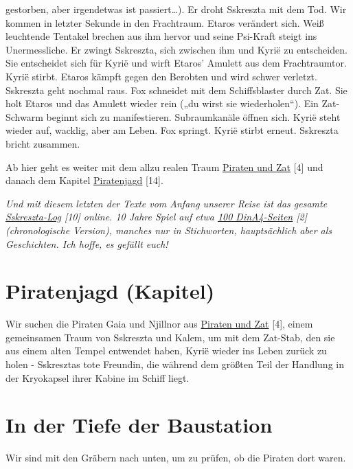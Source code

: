 \documentclass[11pt]{scrartcl}
\begin{document}
\begin{itemize}
{  gestorben, aber irgendetwas ist passiert\ldots{})}. Er droht Sskreszta
  mit dem Tod. Wir kommen in letzter Sekunde in den Frachtraum. Etaros
  verändert sich. Weiß leuchtende Tentakel brechen aus ihm hervor und
  seine Psi-Kraft steigt ins Unermessliche. Er zwingt Sskreszta, sich
  zwischen ihm und Kyrië zu entscheiden. Sie entscheidet sich für Kyrië
  und wirft Etaros' Amulett aus dem Frachtraumtor. Kyrië stirbt. Etaros
  kämpft gegen den Berobten und wird schwer verletzt. Sskreszta geht
  nochmal raus. Fox schneidet mit dem Schiffsblaster durch Zat. Sie holt
  Etaros und das Amulett wieder rein („du wirst sie wiederholen``). Ein
  Zat-Schwarm beginnt sich zu manifestieren. Subraumkanäle öffnen sich.
  Kyrië steht wieder auf, wacklig, aber am Leben. Fox springt. Kyrië
  stirbt erneut. Sskreszta bricht zusammen.
\end{itemize}
Ab hier geht es weiter mit dem allzu realen Traum
\href{http://1w6.org/deutsch/welten/raumzeit/geschichten/piraten-und-zerg}{Piraten
und Zat} {[}4{]} und danach dem Kapitel
\href{http://1w6.org/deutsch/waechter-der-zeit/aufzeichnungen/sskreszta/piratenjagd}{Piratenjagd}
{[}14{]}.

\emph{Und mit diesem letzten der Texte vom Anfang unserer Reise ist das
gesamte
\href{http://1w6.org/deutsch/kampagnen/friedenszwang/aufzeichnungen/sskreszta-log}{Sskreszta-Log}
{[}10{]} online. 10 Jahre Spiel auf etwa
\href{http://1w6.org/print/book/export/html/59}{100 DinA4-Seiten}
{[}2{]} (chronologische Version), manches nur in Stichworten,
hauptsächlich aber als Geschichten. Ich hoffe, es gefällt euch!}

\section{Piratenjagd (Kapitel)}

Wir suchen die Piraten Gaia und Njillnor aus
\href{http://1w6.org/deutsch/welten/raumzeit/geschichten/piraten-und-zerg}{Piraten
und Zat} {[}4{]}, einem gemeinsamen Traum von Sskreszta und Kalem, um
mit dem Zat-Stab, den sie aus einem alten Tempel entwendet haben, Kyrië
wieder ins Leben zurück zu holen - Sskresztas tote Freundin, die während
dem größten Teil der Handlung in der Kryokapsel ihrer Kabine im Schiff
liegt.

\section{In der Tiefe der Baustation}

Wir sind mit den Gräbern nach unten, um zu prüfen, ob die Piraten dort
waren.
\end{document}
